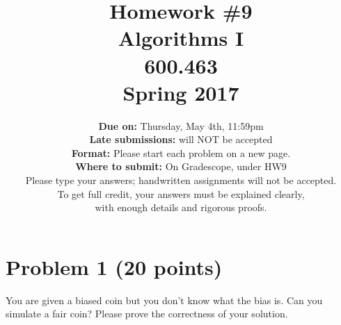 \documentclass[letterpaper, 11pt]{article}
\begin{document}
\title{Homework \#9 \\ Algorithms I \\ 600.463 \\Spring 2017}
\author{\textbf{Due on:} Thursday, May 4th, 11:59pm \\
\textbf{Late submissions:} will NOT be accepted\\
\textbf{Format:} Please start each problem on a new page.
\\\textbf{Where to submit:} On Gradescope, under HW9
\\ Please type your answers; handwritten assignments will not be accepted.
\\ To get full credit, your answers must be explained clearly,\\ with enough details
and rigorous proofs.
\\}

\maketitle

\section*{Problem 1 (20 points)}
You are given a biased coin but you don’t know what the bias is. Can you simulate a fair coin? Please prove the correctness of your solution.

\newpage
\end{document}
